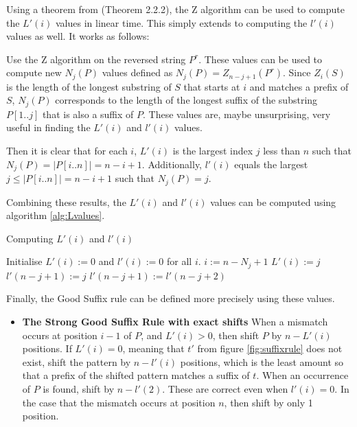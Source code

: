 Using a theorem from \cite{Gusfield1997AlgorithmsOS} (Theorem 2.2.2), the Z algorithm can be used to compute the $L'(i)$ values in linear time. This simply extends to computing the $l'(i)$ values as well. It works as follows:

Use the Z algorithm on the reversed string $P^r$. These values can be used to compute new $N_j(P)$ values defined as $N_j(P)=Z_{n-j+1}(P^r)$. Since $Z_i(S)$ is the length of the longest substring of $S$ that starts at $i$ and matches a prefix of $S$, $N_j(P)$ corresponds to the length of the longest suffix of the substring $P[1..j]$ that is also a suffix of $P$. These values are, maybe unsurprising, very useful in finding the $L'(i)$ and $l'(i)$ values. 

Then it is clear that for each $i$, $L'(i)$ is the largest index $j$ less than $n$ such that $N_j(P)=|P[i..n]|=n-i+1$. Additionally, $l'(i)$ equals the largest $j\leq|P[i..n]|=n-i+1$ such that $N_j(P)=j$. 

Combining these results, the $L'(i)$ and $l'(i)$ values can be computed using algorithm \ref{alg:Lvalues}. 

\begin{algorithm}[htb!]
\caption{Computing $L'(i)$ and $l'(i)$}\label{alg:Lvalues}
\begin{algorithmic}
\State Initialise $L'(i):=0$ and $l'(i):=0$ for all $i$. 
        \State $i:=n-N_j+1$
        \State $L'(i):=j$
    \EndIf
\EndFor
{}
    \State $l'(n-j+1) := j$
    \Else
    \State $l'(n-j+1) := l'(n-j+2)$ 
    \EndIf
\EndFor
\end{algorithmic}
\end{algorithm}

Finally, the Good Suffix rule can be defined more precisely using these values. 

\begin{itemize}
    \item[] \textbf{The Strong Good Suffix Rule with exact shifts} When a mismatch occurs at position $i-1$ of $P$, and $L'(i)>0$, then shift $P$ by $n-L'(i)$ positions. If $L'(i)=0$, meaning that $t'$ from figure \ref{fig:suffixrule} does not exist, shift the pattern by $n-l'(i)$ positions, which is the least amount so that a prefix of the shifted pattern matches a suffix of $t$. When an occurrence of $P$ is found, shift by $n-l'(2)$. These are correct even when $l'(i)=0$. In the case that the mismatch occurs at position $n$, then shift by only 1 position. 
\end{itemize}

